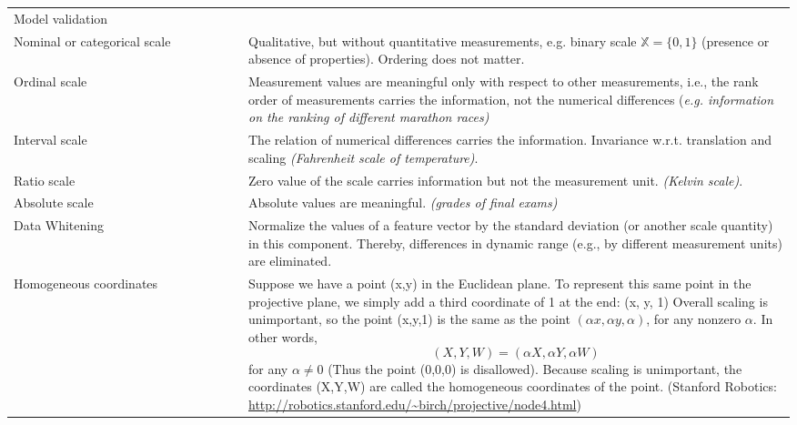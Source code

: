 \documentclass[main]{subfiles}
\begin{document}
\begin{longtable}{p{0.3\linewidth} p{0.7\linewidth}}
Model validation & \\
Nominal or categorical scale & Qualitative, but without quantitative measurements,
e.g. binary scale \(\mathbb{X} = \{0, 1\}\) (presence or absence of
properties). Ordering does not matter.\\
Ordinal scale & Measurement values are meaningful only with respect to other measurements, i.e., the rank order of measurements carries
the information, not the numerical differences {\color{orange}(\emph{e.g. information on the ranking of different marathon races)}}\\
Interval scale &  The relation of numerical differences carries
the information. Invariance w.r.t. translation and scaling {\color{orange}\emph{(Fahrenheit scale of temperature)}}.\\
Ratio scale & Zero value of the scale carries information but not the measurement unit. {\color{orange}\emph{(Kelvin scale)}}.\\
Absolute scale & Absolute values are meaningful. {\color{orange}\emph{(grades of final exams)}}\\
Data Whitening & Normalize the values of a feature vector by the standard deviation (or another scale quantity) in this component. Thereby, differences in dynamic range (e.g., by different measurement units) are eliminated.\\
Homogeneous coordinates \label{homogeneous-coordinates@Glossary} & Suppose we have a point (x,y) in the Euclidean plane. To represent this same point in the projective plane, we simply add a third coordinate of 1 at the end: (x, y, 1) Overall scaling is unimportant, so the point (x,y,1) is the same as the point  \((\alpha x, \alpha y, \alpha)\), for any nonzero \(\alpha\). In other words, 
\[(X,Y,W) = (\alpha X, \alpha Y, \alpha W)\]
for any  $\alpha \neq 0$ (Thus the point (0,0,0) is disallowed). Because scaling is unimportant, the coordinates (X,Y,W) are called the homogeneous coordinates of the point. (Stanford Robotics: \url{http://robotics.stanford.edu/~birch/projective/node4.html})\\


\end{longtable}
\end{document}

